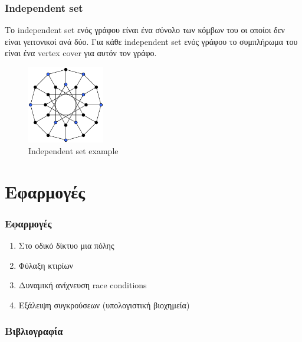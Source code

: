 \documentclass[greek]{beamer}
\begin{document}

\begin{frame}
\frametitle{Independent set}
Το independent set ενός γράφου είναι ένα σύνολο των κόμβων του οι οποίοι δεν είναι γειτονικοί ανά δύο.
Για κάθε independent set ενός γράφου το συμπλήρωμα του είναι ένα vertex cover για αυτόν τον γράφο.
\begin{figure}[H]
\caption{Independent set example}
\centering
\includegraphics[width=0.3\textwidth]{Figures/indep_set.png}\centering
\end{figure}
\end{frame}


\section{Εφαρμογές}

\begin{frame}
\frametitle{Εφαρμογές}
\begin{enumerate}
\item Στο οδικό δίκτυο μια πόλης
\item Φύλαξη κτιρίων
\item Δυναμική ανίχνευση race conditions
\item Εξάλειψη συγκρούσεων (υπολογιστική βιοχημεία)
\end{enumerate}
\end{frame}


\begin{frame}[allowframebreaks]
\frametitle{Βιβλιογραφία}
\printbibliography
\end{frame}
\end{document}
